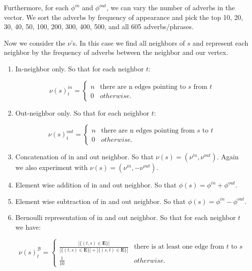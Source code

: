 Furthermore, for each $\phi^{in}$ and $\phi^{out}$, we can vary the number of adverbs in the vector. We sort the adverbs by frequency of appearance and pick the top 10, 20, 30, 40, 50, 100, 200, 300, 400, 500, and all 605 adverbs/phrases. 

Now we consider the $\nu$'s. In this case we find all neighbors of $s$ and represent each neighbor by the frequency of adverbs between the neighbor and our vertex. 

\begin{enumerate}
	\item In-neighbor only. So that for each neighbor $t$:

		\[   
		\nu(s)^{in}_t = \left\{
		\begin{array}{ll}
		      n & \text{there are n edges pointing to $s$ from $t$} \\
		      0 & otherwise.
		\end{array} 
		\right.
		\]

	\item Out-neighbor only. So that for each neighbor $t$:

		\[   
		\nu(s)^{out}_t = \left\{
		\begin{array}{ll}
		      n & \text{there are n edges pointing from $s$ to $t$} \\
		      0 & otherwise.
		\end{array} 
		\right. 
		\]

	\item Concatenation of in and out neighbor. So that $\nu(s) = (\nu^{in}, \nu^{out})$. Again we also experiment with $\nu(s) = (\nu^{in}, -\nu^{out})$.

	\item Element wise addition of in and out neighbor. So that $\phi(s) = \phi^{in} + \phi^{out}$.
	
	\item Element wise subtraction of in and out neighbor. So that $\phi(s) = \phi^{in} - \phi^{out}$.

	\item Bernoulli representation of in and out neighbor. So that for each neighbor $t$ we have:

		\[   
			\nu(s)^{\mathcal{B}}_t = \left\{
			\begin{array}{ll}
			      \frac{|\{(t,s) \in \pmb{E}\}|}{|\{(t,s) \in \pmb{E}\}| + |\{(s,t) \in \pmb{E}\}|} & \text{there is at least one edge from $t$ to $s$} \\
			      \frac{1}{10} & otherwise.
			\end{array} 
			\right. 
		\]

\end{enumerate}


